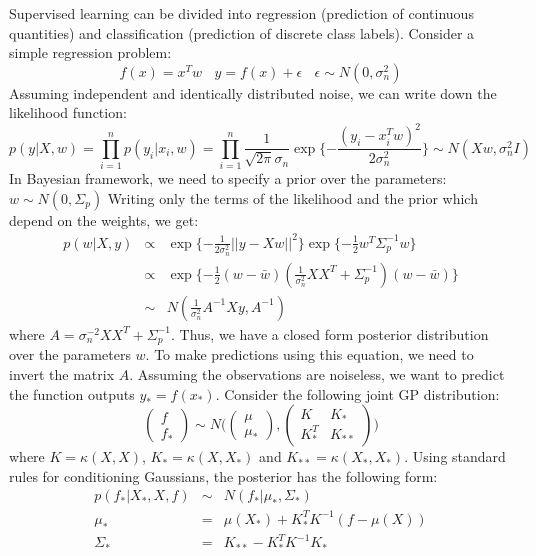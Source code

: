 Supervised learning can be divided into regression (prediction of continuous quantities) and classification (prediction of discrete class labels). Consider a simple regression problem:
\begin{equation}
    f(x) = x^{T}w ~~~~ y = f(x) + \epsilon ~~~~ \epsilon \sim N(0,\sigma_{n}^{2})
\end{equation}
Assuming independent and identically distributed noise, we can write down the likelihood function:
\begin{equation}
    p(y|X,w) = \prod_{i=1}^{n}p(y_i|x_i,w) = \prod_{i=1}^{n}\frac{1}{\sqrt{2\pi}\sigma_n}\exp\{-\frac{(y_i - x_{i}^{T}w)^{2}}{2\sigma_{n}^{2}} \} \sim N(Xw, \sigma_{n}^{2}I)
\end{equation}
In Bayesian framework, we need to specify a prior over the parameters: $w \sim N(0,\Sigma_p)$
Writing only the terms of the likelihood and the prior which depend on the weights, we get:
\begin{eqnarray}
   p(w|X,y) &\propto& \exp\{-\frac{1}{2\sigma_{n}^{2}}||y-Xw||^{2}\}\exp\{-\frac{1}{2}w^{T}\Sigma_{p}^{-1}w\} \\
   &\propto& \exp\{-\frac{1}{2}(w-\bar{w})(\frac{1}{\sigma_{n}^{2}}XX^{T}+\Sigma_{p}^{-1})(w-\bar{w})\}\\
   &\sim& N(\frac{1}{\sigma_{n}^{2}}A^{-1}Xy, A^{-1})
\end{eqnarray}
where $A = \sigma_{n}^{-2}XX^{T} + \Sigma_{p}^{-1}$. Thus, we have a closed form posterior distribution over the parameters $w$. To make predictions using this equation, we need to invert the matrix $A$. 
Assuming the observations are noiseless, we want to predict the function outputs $y_{\ast} = f(x_{\ast})$. Consider the following joint GP distribution:
\begin{equation}
\left( \begin{array}{c}
f\\
f_{\ast} \end{array} \right)
\sim
N \bigg(\left( \begin{array}{c}
\mu\\
\mu_{\ast} \end{array} \right),
\left( \begin{array}{cc}
K & K_{\ast}\\
K_{\ast}^{T} & K_{\ast\ast} \end{array} \right) \bigg)
\end{equation}
where $K=\kappa(X,X)$, $K_{\ast}=\kappa(X,X_{\ast})$ and $K_{\ast\ast}=\kappa(X_{\ast}, X_{\ast})$. Using standard rules for conditioning Gaussians, the posterior has the following form:
\begin{eqnarray}
    p(f_{\ast}|X_{\ast}, X, f) &\sim& N(f_{\ast}|\mu_{\ast},\Sigma_{\ast})\\
    \mu_{\ast} &=& \mu(X_{\ast}) + K_{\ast}^{T}K^{-1}(f-\mu(X))\\
    \Sigma_{\ast} &=& K_{\ast\ast} - K_{\ast}^{T}K^{-1}K_{\ast}
\end{eqnarray}

